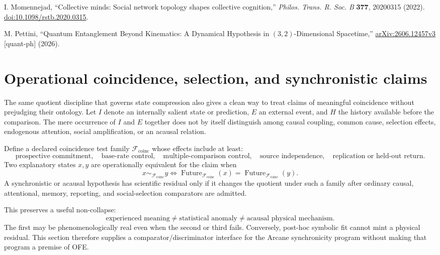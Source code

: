 \documentclass[11pt]{article}
\newcommand{\F}{\mathcal F}
\newcommand{\Future}{\operatorname{Future}}
\begin{document}
\begin{thebibliography}{99}
I. Momennejad,
``Collective minds: Social network topology shapes collective cognition,''
\emph{Philos. Trans. R. Soc. B} \textbf{377}, 20200315 (2022).
\href{https://doi.org/10.1098/rstb.2020.0315}{doi:10.1098/rstb.2020.0315}.

M. Pettini,
``Quantum Entanglement Beyond Kinematics: A Dynamical Hypothesis in $(3,2)$-Dimensional Spacetime,''
\href{https://arxiv.org/abs/2606.12457}{arXiv:2606.12457v3} [quant-ph] (2026).

\end{thebibliography}


\section{Operational coincidence, selection, and synchronistic claims}

The same quotient discipline that governs state compression also gives a clean
way to treat claims of meaningful coincidence without prejudging their ontology.
Let $I$ denote an internally salient state or prediction, $E$ an external event,
and $H$ the history available before the comparison.  The mere occurrence of
$I$ and $E$ together does not by itself distinguish among causal coupling,
common cause, selection effects, endogenous attention, social amplification, or
an acausal relation.

Define a declared coincidence test family $\F_{\mathrm{coinc}}$ whose effects
include at least:
\[
\text{prospective commitment},\quad
\text{base-rate control},\quad
\text{multiple-comparison control},\quad
\text{source independence},\quad
\text{replication or held-out return}.
\]
Two explanatory states $x,y$ are operationally equivalent for the claim when
\[
x\sim_{\F_{\mathrm{coinc}}}y
\iff
\Future_{\F_{\mathrm{coinc}}}(x)
=
\Future_{\F_{\mathrm{coinc}}}(y).
\]
A synchronistic or acausal hypothesis has scientific residual only if it changes
the quotient under such a family after ordinary causal, attentional, memory,
reporting, and social-selection comparators are admitted.

This preserves a useful non-collapse:
\[
\boxed{
\text{experienced meaning}
\neq
\text{statistical anomaly}
\neq
\text{acausal physical mechanism}.
}
\]
The first may be phenomenologically real even when the second or third fails.
Conversely, post-hoc symbolic fit cannot mint a physical residual.  This section
therefore supplies a comparator/discriminator interface for the Arcane
synchronicity program without making that program a premise of OFE.
\end{document}
